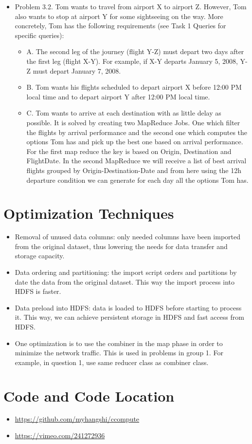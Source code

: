 \documentclass[fontsize=11pt,paper=a4]{scrartcl}
\begin{document}
\begin{itemize}
\item Problem 3.2. Tom wants to travel from airport X to airport Z. However, Tom also wants to stop at airport Y for some sightseeing on the way. More concretely, Tom has the following requirements (see Task 1 Queries for specific queries):
\begin{itemize}
\item A. The second leg of the journey (flight Y-Z) must depart two days after the first leg (flight X-Y). For example, if X-Y departs January 5, 2008, Y-Z must depart January 7, 2008.
\item B. Tom wants his flights scheduled to depart airport X before 12:00 PM local time and to depart airport Y after 12:00 PM local time.
\item C. Tom wants to arrive at each destination with as little delay as possible.
It is solved by creating two MapReduce Jobs. One which filter the
flights by arrival performance and the second one which computes the options Tom has and pick up the best one based on arrival performance. For the first map reduce the key is based on Origin, Destination and FlightDate. In the second MapReduce we will receive a list of best arrival flights grouped by Origin-Destination-Date and from here using the 12h departure condition we can generate for each day all the options Tom has.
\end{itemize}
\end{itemize}

\section{Optimization Techniques}
\begin{itemize}
\item Removal of unused data columns: only needed columns have been imported from the original dataset, thus lowering the needs for data transfer and storage capacity.
\item Data ordering and partitioning: the import script orders and partitions by date the data from the original dataset. This way the import process into HDFS is faster.
\item Data preload into HDFS: data  is loaded to HDFS before starting to process it. This way, we can achieve persistent storage in HDFS and fast access from HDFS.
\item One optimization is to use the combiner in the map phase in order to minimize the network traffic. This is used in problems in group 1. For example, in question 1, use same reducer class as combiner class. 

\end{itemize} 
 
\section{Code and Code Location}
\begin{itemize}
\item \url{https://github.com/myhangshi/ccompute}
\item \url{https://vimeo.com/241272936}
\end{itemize} 
 
\end{document}
